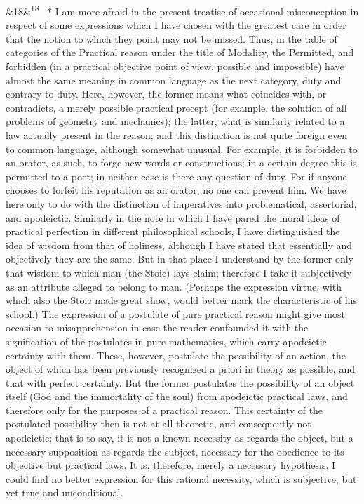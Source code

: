 \documentclass[12pt]{article}
\newcommand{\para}[1][]{\par\noindent\ifx&#1&\else\textsuperscript{\footnotesize #1}~\fi}
\begin{document}
\para[18] * I am more afraid in the present treatise of occasional misconception in respect of some expressions which I have chosen with the greatest care in order that the notion to which they point may not be missed. Thus, in the table of categories of the Practical reason under the title of Modality, the Permitted, and forbidden (in a practical objective point of view, possible and impossible) have almost the same meaning in common language as the next category, duty and contrary to duty. Here, however, the former means what coincides with, or contradicts, a merely possible practical precept (for example, the solution of all problems of geometry and mechanics); the latter, what is similarly related to a law actually present in the reason; and this distinction is not quite foreign even to common language, although somewhat unusual. For example, it is forbidden to an orator, as such, to forge new words or constructions; in a certain degree this is permitted to a poet; in neither case is there any question of duty. For if anyone chooses to forfeit his reputation as an orator, no one can prevent him. We have here only to do with the distinction of imperatives into problematical, assertorial, and apodeictic. Similarly in the note in which I have pared the moral ideas of practical perfection in different philosophical schools, I have distinguished the idea of wisdom from that of holiness, although I have stated that essentially and objectively they are the same. But in that place I understand by the former only that wisdom to which man (the Stoic) lays claim; therefore I take it subjectively as an attribute alleged to belong to man. (Perhaps the expression virtue, with which also the Stoic made great show, would better mark the characteristic of his school.) The expression of a postulate of pure practical reason might give most occasion to misapprehension in case the reader confounded it with the signification of the postulates in pure mathematics, which carry apodeictic certainty with them. These, however, postulate the possibility of an action, the object of which has been previously recognized a priori in theory as possible, and that with perfect certainty. But the former postulates the possibility of an object itself (God and the immortality of the soul) from apodeictic practical laws, and therefore only for the purposes of a practical reason. This certainty of the postulated possibility then is not at all theoretic, and consequently not apodeictic; that is to say, it is not a known necessity as regards the object, but a necessary supposition as regards the subject, necessary for the obedience to its objective but practical laws. It is, therefore, merely a necessary hypothesis. I could find no better expression for this rational necessity, which is subjective, but yet true and unconditional.
\end{document}
